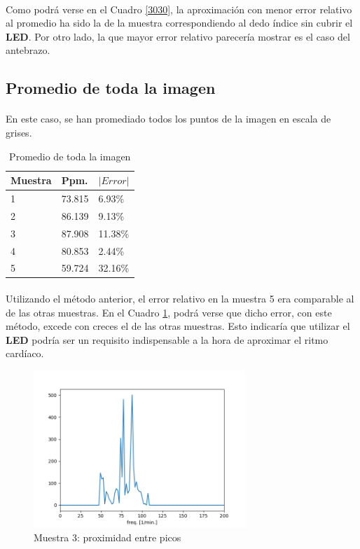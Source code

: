 \documentclass[12pt, twocolumn]{article}
\begin{document}
	\paragraph{} Como podrá verse en el Cuadro \ref{3030}, la aproximación con menor error relativo al promedio ha sido la de la muestra correspondiendo al dedo índice sin cubrir el \textbf{LED}. Por otro lado, la que mayor error relativo parecería mostrar es el caso del antebrazo.
	
	\subsection{Promedio de toda la imagen}
	
	\paragraph{} En este caso, se han promediado todos los puntos de la imagen en escala de grises.
	
	\begin{table}[H]
		\centering
		\label{my-label}
		\begin{tabular}{@{}lll@{}}
			\toprule
			Muestra & Ppm.   &  $|Error|$    \\ \midrule
			1    & 73.815 & 6.93\%  \\
			2    & 86.139 & 9.13\%  \\
			3    & 87.908 & 11.38\% \\
			4    & 80.853 & 2.44\%  \\
			5    & 59.724 & 32.16\% \\ \bottomrule
		\end{tabular}
		\caption{Promedio de toda la imagen}
		\label{prom}
	\end{table}
	
	\paragraph{} Utilizando el método anterior, el error relativo en la muestra 5 era comparable al de las otras muestras. En el Cuadro \ref{prom}, podrá verse que dicho error, con este método, excede con creces el de las otras muestras. Esto indicaría que utilizar el \textbf{LED} podría ser un requisito indispensable a la hora de aproximar el ritmo cardíaco.
	
	\begin{figure}[H]
		\centering
		\includegraphics[width=8cm]{sample3_all.png}
		\caption{Muestra 3: proximidad entre picos}
		\label{3prox}
	\end{figure}
	
\end{document}
